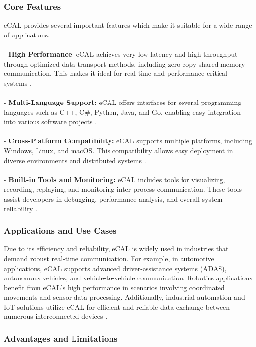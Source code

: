 \subsubsection{Core Features}

eCAL provides several important features which make it suitable for a wide range of applications:
\\
\\
- \textbf{High Performance:} eCAL achieves very low latency and high throughput through optimized data transport methods, including zero-copy shared memory communication. This makes it ideal for real-time and performance-critical systems \cite{ecal_github,ecal_official_docs}.
\\
\\
- \textbf{Multi-Language Support:} eCAL offers interfaces for several programming languages such as C++, C\#, Python, Java, and Go, enabling easy integration into various software projects \cite{ecal_official_docs}.
\\
\\
- \textbf{Cross-Platform Compatibility:} eCAL supports multiple platforms, including Windows, Linux, and macOS. This compatibility allows easy deployment in diverse environments and distributed systems \cite{ecal_official_docs}.
\\
\\
- \textbf{Built-in Tools and Monitoring:} eCAL includes tools for visualizing, recording, replaying, and monitoring inter-process communication. These tools assist developers in debugging, performance analysis, and overall system reliability \cite{ecal_github,ecal_official_docs}.

\subsubsection{Applications and Use Cases}

Due to its efficiency and reliability, eCAL is widely used in industries that demand robust real-time communication. For example, in automotive applications, eCAL supports advanced driver-assistance systems (ADAS), autonomous vehicles, and vehicle-to-vehicle communication. Robotics applications benefit from eCAL's high performance in scenarios involving coordinated movements and sensor data processing. Additionally, industrial automation and IoT solutions utilize eCAL for efficient and reliable data exchange between numerous interconnected devices \cite{ecal_github,ecal_official_docs}.

\subsubsection{Advantages and Limitations}

